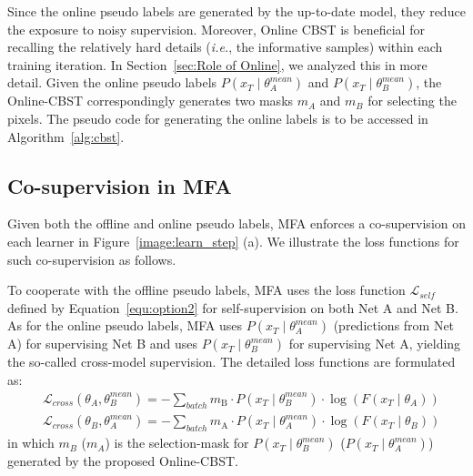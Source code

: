 \documentclass{bmvc2k}
\begin{document}
Since the online pseudo labels are generated by the up-to-date model, they reduce the exposure to noisy supervision. Moreover, Online CBST is beneficial for recalling the relatively hard details (\emph{i.e.}, the informative samples) within each training iteration. In Section~\ref{sec:Role of Online}, we analyzed this in more detail. Given the online pseudo labels $P(x_T\mid\theta_A^{mean})$ and $P(x_T\mid\theta_B^{mean})$, the Online-CBST correspondingly generates two masks $m_A$ and $m_B$ for selecting the pixels. The pseudo code for generating the online labels is to be accessed in Algorithm~\ref{alg:cbst}. 

\subsection{Co-supervision in MFA} \label{sec: co-supervision}

Given both the offline and online pseudo labels, MFA enforces a co-supervision on each learner in Figure~\ref{image:learn_step} (a). We illustrate the loss functions for such co-supervision as follows.

To cooperate with the offline pseudo labels, MFA uses the loss function $\mathcal{L}_{self}$ defined by Equation~\ref{equ:option2} for self-supervision on both Net A and Net B. As for the online pseudo labels, MFA uses $P(x_T\mid\theta_A^{mean})$ (predictions from Net A) for supervising Net B and uses $P(x_T\mid\theta_B^{mean})$ for supervising Net A, yielding the so-called cross-model supervision. The detailed loss functions are formulated as:\begin{equation}
\label{equ:option9}
\begin{aligned}
&\mathcal{L}_{cross}(\theta_{A}, \theta_{B}^{mean}) = -\mathop{\sum}_{batch}m_{\text{B}}\cdot P\left ( x_{T} \mid \theta_{B}^{mean} \right )   \cdot \log \left (F\left ( x_{T} \mid\theta_{A}\right )\right ) \\
& \mathcal{L}_{cross}(\theta_{B}, \theta_{A}^{mean}) = -\mathop{\sum}_{batch}m_{\text{A}}\cdot P\left ( x_{T} \mid \theta_{A}^{mean} \right ) \cdot \log \left (F\left ( x_{T} \mid\theta_{B}\right ) \right ) 
\end{aligned}
\end{equation}in which $m_B$ ($m_A$) is the selection-mask for $P(x_T\mid\theta_B^{mean})$ ($P(x_T\mid\theta_A^{mean})$) generated by the proposed Online-CBST.
\end{document}
